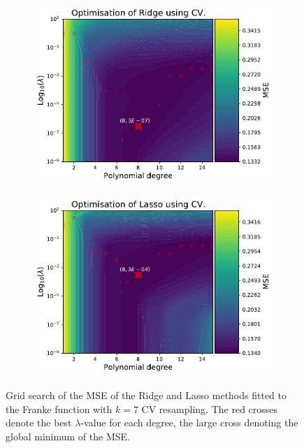 \documentclass[twocolumn,english,notitlepage]{article}
\begin{document}
        \begin{figure}[ht]
            \begin{subfigure}{\linewidth}
                \centering
                \includegraphics[width=\linewidth]{heatmap_ridge.pdf}
            \end{subfigure}
            \begin{subfigure}{\linewidth}
                \centering
                \includegraphics[width=\linewidth]{heatmap_lasso.pdf}
            \end{subfigure}
            \caption{Grid search of the MSE of the Ridge and Lasso methods fitted to the Franke function with $k=7$ CV resampling. The red crosses denote the best $\lambda$-value for each degree, the large cross denoting the global minimum of the MSE.}
            \label{res:fig:Franke_heatmaps}
        \end{figure}
\end{document}

